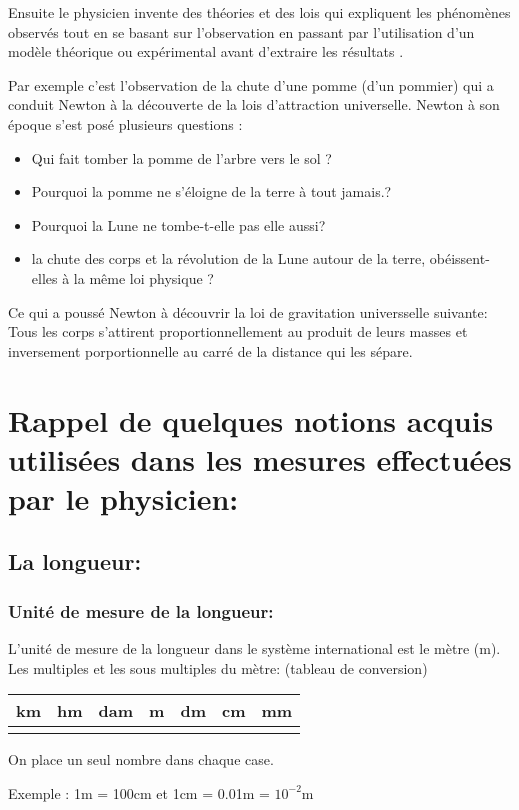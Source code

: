 \documentclass[12pt]{article}
\begin{document}
      Ensuite le physicien invente des théories et des lois qui expliquent les phénomènes observés tout en se basant sur
l'observation en passant par l'utilisation d'un modèle théorique ou expérimental avant d'extraire les résultats .

Par exemple c'est l'observation de la chute d'une pomme (d’un pommier) qui a conduit Newton à la découverte de la
lois d'attraction universelle.
Newton à son époque s’est posé plusieurs questions :
\begin{itemize}
   \item Qui fait tomber la pomme de l’arbre vers le sol ?
   \item Pourquoi la pomme ne s'éloigne de la terre à tout jamais.?
   \item Pourquoi la Lune ne tombe-t-elle pas elle aussi?
   \item la chute des corps et la révolution de la Lune autour de la terre, obéissent-elles à la même loi physique ?
      \end{itemize}
Ce qui a poussé Newton à découvrir la loi de gravitation universselle suivante:
Tous les corps s'attirent proportionnellement au produit de leurs masses et inversement porportionnelle au carré de la
distance qui les sépare.

\section{Rappel de quelques notions acquis utilisées dans les mesures effectuées par le physicien:}

\subsection{La longueur:}
\subsubsection{Unité de mesure de la longueur: }
L'unité de mesure de la longueur dans le système international est le mètre (m).
Les multiples et les sous multiples du mètre: (tableau de conversion)

\begin{center}
   \begin{tabular}{ |c|c|c|c|c|c|c| }
      \hline
      km & hm & dam & \bf{m} & dm & cm & mm \\
      \hline
        &   &    &  &   &   & \\
\hline
\end{tabular}
On place un seul nombre dans chaque case.
\end{center}
Exemple : 1m  =  100cm et 1cm = 0.01m = $10^{-2}$m
\end{document}
